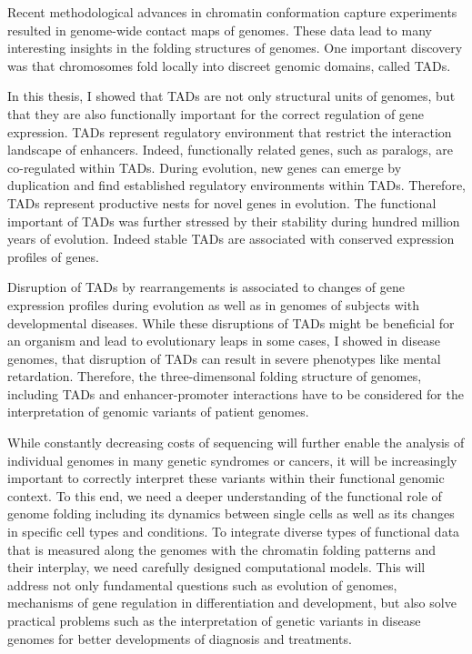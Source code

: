 \documentclass[a4paper,twoside=true,openright,parskip=full,chapterprefix=true,11pt,headings=normal,bibliography=totoc,listof=totoc,titlepage=on,captions=tableabove,draft=false]{scrreprt}
\theoremstyle{definition}
\theoremstyle{definition}
\theoremstyle{definition}
\theoremstyle{remark}
\begin{document}
Recent methodological advances in chromatin conformation capture
experiments resulted in genome-wide contact maps of genomes. These data
lead to many interesting insights in the folding structures of genomes.
One important discovery was that chromosomes fold locally into discreet
genomic domains, called TADs.

In this thesis, I showed that TADs are not only structural units of
genomes, but that they are also functionally important for the correct
regulation of gene expression. TADs represent regulatory environment
that restrict the interaction landscape of enhancers. Indeed,
functionally related genes, such as paralogs, are co-regulated within
TADs. During evolution, new genes can emerge by duplication and find
established regulatory environments within TADs. Therefore, TADs
represent productive nests for novel genes in evolution. The functional
important of TADs was further stressed by their stability during hundred
million years of evolution. Indeed stable TADs are associated with
conserved expression profiles of genes.

Disruption of TADs by rearrangements is associated to changes of gene
expression profiles during evolution as well as in genomes of subjects
with developmental diseases. While these disruptions of TADs might be
beneficial for an organism and lead to evolutionary leaps in some cases,
I showed in disease genomes, that disruption of TADs can result in
severe phenotypes like mental retardation. Therefore, the
three-dimensonal folding structure of genomes, including TADs and
enhancer-promoter interactions have to be considered for the
interpretation of genomic variants of patient genomes.

While constantly decreasing costs of sequencing will further enable the
analysis of individual genomes in many genetic syndromes or cancers, it
will be increasingly important to correctly interpret these variants
within their functional genomic context. To this end, we need a deeper
understanding of the functional role of genome folding including its
dynamics between single cells as well as its changes in specific cell
types and conditions. To integrate diverse types of functional data that
is measured along the genomes with the chromatin folding patterns and
their interplay, we need carefully designed computational models. This
will address not only fundamental questions such as evolution of
genomes, mechanisms of gene regulation in differentiation and
development, but also solve practical problems such as the
interpretation of genetic variants in disease genomes for better
developments of diagnosis and treatments.
\end{document}
